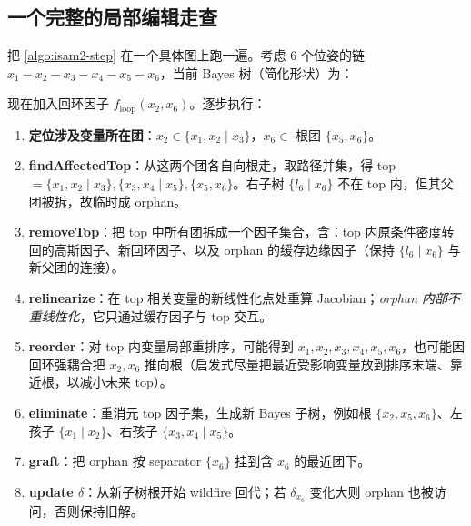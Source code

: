 \subsection{一个完整的局部编辑走查}
\label{sec:isam-worked}

把 \cref{algo:isam2-step} 在一个具体图上跑一遍。考虑 $6$ 个位姿的链 $x_1-x_2-x_3-x_4-x_5-x_6$，当前 Bayes 树（简化形状）为：

\begin{center}
\small
{}
\end{center}

\noindent 现在加入回环因子 $f_{\text{loop}}(x_2,x_6)$。逐步执行：
\begin{enumerate}
  \item \textbf{定位涉及变量所在团}：$x_2\in\{x_1,x_2\mid x_3\}$，$x_6\in$ 根团 $\{x_5,x_6\}$。
  \item \textbf{findAffectedTop}：从这两个团各自向根走，取路径并集，得 top $=\{x_1,x_2\mid x_3\},\{x_3,x_4\mid x_5\},\{x_5,x_6\}$。右子树 $\{l_6\mid x_6\}$ 不在 top 内，但其父团被拆，故临时成 orphan。
  \item \textbf{removeTop}：把 top 中所有团拆成一个因子集合，含：top 内原条件密度转回的高斯因子、新回环因子、以及 orphan 的缓存边缘因子（保持 $\{l_6\mid x_6\}$ 与新父团的连接）。
  \item \textbf{relinearize}：在 top 相关变量的新线性化点处重算 Jacobian；\emph{orphan 内部不重线性化}，它只通过缓存因子与 top 交互。
  \item \textbf{reorder}：对 top 内变量局部重排序，可能得到 $x_1,x_2,x_3,x_4,x_5,x_6$，也可能因回环强耦合把 $x_2,x_6$ 推向根（启发式尽量把最近受影响变量放到排序末端、靠近根，以减小未来 top）。
  \item \textbf{eliminate}：重消元 top 因子集，生成新 Bayes 子树，例如根 $\{x_2,x_5,x_6\}$、左孩子 $\{x_1\mid x_2\}$、右孩子 $\{x_3,x_4\mid x_5\}$。
  \item \textbf{graft}：把 orphan 按 separator $\{x_6\}$ 挂到含 $x_6$ 的最近团下。
  \item \textbf{update $\delta$}：从新子树根开始 wildfire 回代；若 $\delta_{x_6}$ 变化大则 orphan 也被访问，否则保持旧解。
\end{enumerate}

